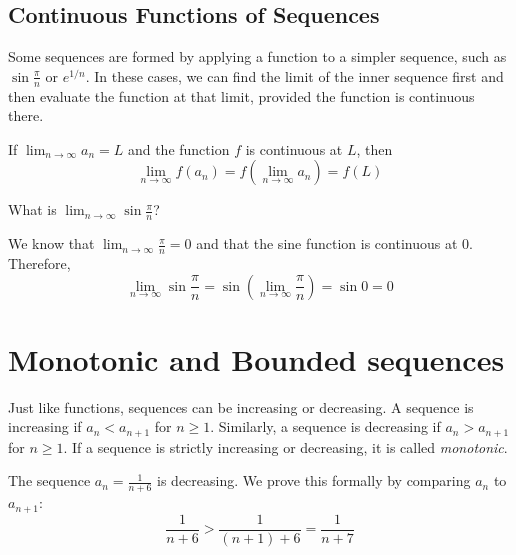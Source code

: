 \subsection{Continuous Functions of Sequences}
Some sequences are formed by applying a function to a simpler sequence, such as
$\sin{\frac{\pi}{n}}$ or $e^{1/n}$. In these cases, we can find the limit of
the inner sequence first and then evaluate the function at that limit, provided
the function is continuous there.

If $\lim_{n \to \infty} a_n = L$ and the function $f$ is continuous at $L$,
then
$$\lim_{n \to \infty} f(a_n) = f\left(\lim_{n \to \infty} a_n\right) = f(L)$$

\begin{Worked}
\begin{Problem}
What is $\lim_{n \to \infty} \sin{\frac{\pi}{n}}$?
\end{Problem}
\begin{Solution}
We know that $\lim_{n \to \infty} \frac{\pi}{n} = 0$ and
that the sine function is continuous at 0. Therefore,
$$\lim_{n \to \infty} \sin{\frac{\pi}{n}} = \sin{\left(\lim_{n \to \infty}
        \frac{\pi}{n}\right)} = \sin{0} = 0$$
\end{Solution}
\end{Worked}

\section{Monotonic and Bounded sequences}
Just like functions, sequences can be increasing or decreasing. A sequence is
increasing if $a_n < a_{n+1}$ for $n \geq 1$. Similarly, a sequence is
decreasing if $a_n > a_{n+1}$ for $n \geq 1$. If a sequence is strictly
increasing or decreasing, it is called \textit{monotonic}.

The sequence $a_n = \frac{1}{n + 6}$ is decreasing. We prove this formally by
comparing $a_n$ to $a_{n+1}$:
$$\frac{1}{n + 6} > \frac{1}{(n + 1) + 6} = \frac{1}{n + 7}$$


